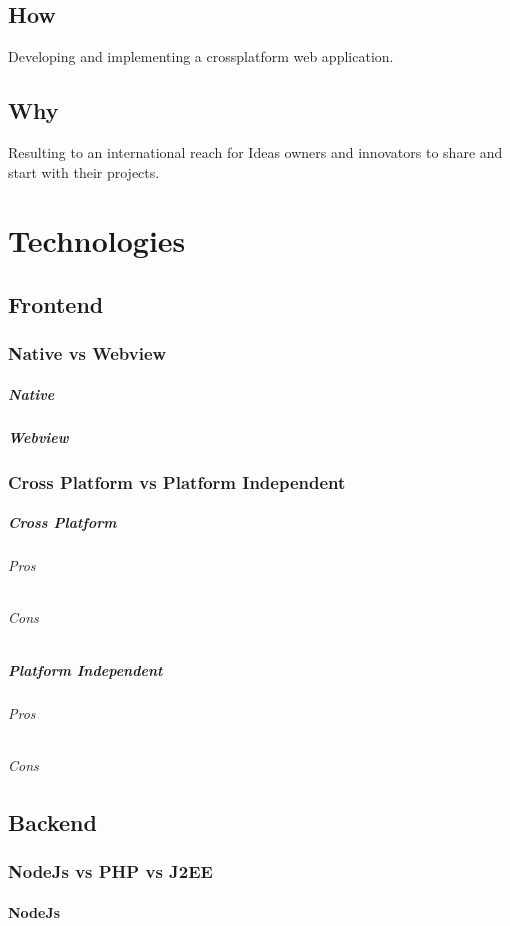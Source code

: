 \documentclass[11pt, openany]{report}
\begin{document}
\section{How}
Developing and implementing a crossplatform web application.
\section{Why} 
Resulting to an international reach for Ideas owners and innovators to share and start with their projects.

\chapter{ Technologies }
\section{Frontend}
\subsection{ Native vs Webview}
\paragraph{Native}
\paragraph{Webview}
\subsection{ Cross Platform vs Platform Independent }
\paragraph{Cross Platform}
\subparagraph{Pros}
\subparagraph{Cons}
\paragraph{Platform Independent}
\subparagraph{Pros}
\subparagraph{Cons}

\section{ Backend }
\subsection{ NodeJs vs PHP vs J2EE }
\subsubsection{NodeJs}
\end{document}
